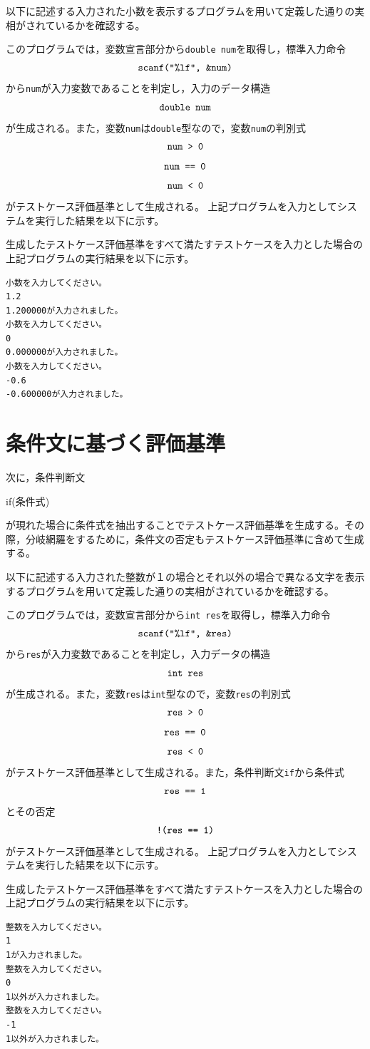 \documentclass{tpu-sotu}
\begin{document}
以下に記述する入力された小数を表示するプログラムを用いて定義した通りの実相がされているかを確認する。

このプログラムでは，変数宣言部分から{\tt double num}を取得し，標準入力命令\\
\[ 
\mbox{{\tt {scanf("\%lf", \&num)}}}
\]
から{\tt num}が入力変数であることを判定し，入力のデータ構造\\
\[
\mbox{{\tt double num}}
\]
が生成される。また，変数{\tt num}は{\tt double}型なので，変数{\tt num}の判別式\\
\[ 
\mbox{\tt{num > 0}} 
\]
\[
\mbox{\tt{num == 0}}
\]
\[
\mbox{\tt{num < 0}}
\]
がテストケース評価基準として生成される。
上記プログラムを入力としてシステムを実行した結果を以下に示す。

生成したテストケース評価基準をすべて満たすテストケースを入力とした場合の上記プログラムの実行結果を以下に示す。
\begin{lstlisting}[xleftmargin=1cm]
小数を入力してください。
1.2
1.200000が入力されました。
小数を入力してください。
0
0.000000が入力されました。
小数を入力してください。
-0.6
-0.600000が入力されました。
\end{lstlisting}

\section{条件文に基づく評価基準}
次に，条件判断文\\
{\tt \centerline {if({条件式})}}
が現れた場合に条件式を抽出することでテストケース評価基準を生成する。その際，分岐網羅をするために，条件文の否定もテストケース評価基準に含めて生成する。

以下に記述する入力された整数が１の場合とそれ以外の場合で異なる文字を表示するプログラムを用いて定義した通りの実相がされているかを確認する。

このプログラムでは，変数宣言部分から{\tt int res}を取得し，標準入力命令\\
\[ 
\mbox{{\tt {scanf("\%lf", \&res)}}}
\]
から{\tt res}が入力変数であることを判定し，入力データの構造\\
\[
\mbox{{\tt  int res}}
\]
が生成される。また，変数{\tt res}は{\tt int}型なので，変数{\tt res}の判別式\\
\[ 
\mbox{\tt{res > 0}} 
\]
\[
\mbox{\tt{res == 0}}
\]
\[
\mbox{\tt{res < 0}}
\]
がテストケース評価基準として生成される。また，条件判断文{\tt if}から条件式\\
\[
\mbox{\tt{res == 1}}
\]
とその否定\\
\[
\mbox{\tt{!(res == 1)}}
\]
がテストケース評価基準として生成される。
上記プログラムを入力としてシステムを実行した結果を以下に示す。

生成したテストケース評価基準をすべて満たすテストケースを入力とした場合の上記プログラムの実行結果を以下に示す。
\begin{lstlisting}[xleftmargin=1cm]
整数を入力してください。
1
1が入力されました。
整数を入力してください。
0
1以外が入力されました。
整数を入力してください。
-1
1以外が入力されました。
\end{lstlisting}
\end{document}
